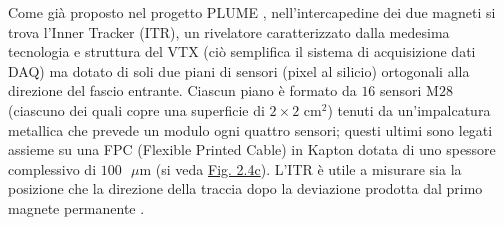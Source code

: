 \documentclass[12pt,a4paper,twoside]{report}
\begin{document}
	Come già proposto nel progetto PLUME \cite{articleNomerotski}, nell'intercapedine dei due magneti si trova l'Inner Tracker (ITR), un rivelatore caratterizzato dalla medesima tecnologia e struttura del VTX (ciò semplifica il sistema di acquisizione dati DAQ) ma dotato di soli due piani di sensori (pixel al silicio) ortogonali alla direzione del fascio entrante. Ciascun piano è formato da $16$ sensori M$28$ (ciascuno dei quali copre una superficie di $2\times2\mbox{ cm}^2$) tenuti da un'impalcatura metallica che prevede un modulo ogni quattro sensori; questi ultimi sono legati assieme su una FPC (Flexible Printed Cable) in Kapton dotata di uno spessore complessivo di $100\mbox{ }\mu\mbox{m}$ (si veda \hyperref[fig:itr]{Fig. 2.4c}). L'ITR è utile a misurare sia la posizione che la direzione della traccia dopo la deviazione prodotta dal primo magnete permanente \cite{foot_cdr,ridolfiArticle}.
\end{document}

